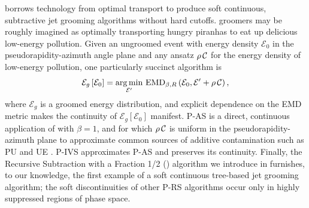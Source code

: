 \PIRANHA{} borrows technology from optimal transport to produce soft continuous, subtractive jet grooming algorithms without hard cutoffs.
%
\PIRANHA{} groomers may be roughly imagined as optimally transporting hungry piranhas to eat up delicious low-energy pollution.
%
Given an ungroomed event with energy density \(\mathcal{E}_{0}\) in the pseudorapidity-azimuth angle plane and any ansatz \(\rho\,\mathcal{C}\) for the energy density of low-energy pollution, one particularly succinct \PIRANHA{} algorithm is
\begin{align}
    \mathcal{E}_g\left[\mathcal{E}_0\right]
    =
    \underset{\mathcal{E}'}{\arg \min}\ {\rm EMD}_{\beta, R}
    \left(\mathcal{E}_0, \mathcal{E}' + \rho\,\mathcal{C}\right)
    \label{eqn:simple_piranha_intro}
    ,
\end{align}
where \(\mathcal{E}_g\) is a groomed energy distribution, and explicit dependence on the EMD metric makes the continuity of \(\mathcal{E}_g\left[\mathcal{E}_0\right]\) manifest.
%
P-AS is a direct, continuous application of  with \(\beta = 1\), and for which \(\rho\,\mathcal{C}\) is uniform in the pseudorapidity-azimuth plane to approximate common sources of additive contamination such as PU and UE \cite{Soyez:2018opl,Monk:2018clo,Sjostrand:1987su,Sjostrand:2014zea,Dasgupta:2007wa,Kirchgaesser:2020poq,Moraes:2007rq,CDF:2015txs,Larkoski:2021hee,Baron:2020xoi,Marzani:2017kqd}.
%
P-IVS approximates P-AS and preserves its continuity.
%
Finally, the Recursive Subtraction with a Fraction 1/2 () algorithm we introduce in  furnishes, to our knowledge, the first example of a soft continuous tree-based jet grooming algorithm;
%
the soft discontinuities of other P-RS algorithms occur only in highly suppressed regions of phase space.


